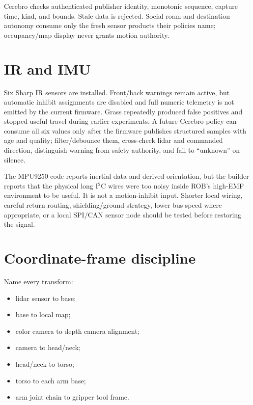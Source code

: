 \documentclass[10pt,openany]{book}
\begin{document}
Cerebro checks authenticated publisher identity, monotonic sequence, capture time, kind, and bounds. Stale data is rejected. Social roam and destination autonomy consume only the fresh sensor products their policies name; occupancy/map display never grants motion authority.

\section{IR and IMU}

\Experimental\quad Six Sharp IR sensors are installed. Front/back warnings remain active, but automatic inhibit assignments are disabled and full numeric telemetry is not emitted by the current firmware. Grass repeatedly produced false positives and stopped useful travel during earlier experiments. A future Cerebro policy can consume all six values only after the firmware publishes structured samples with age and quality; filter/debounce them, cross-check lidar and commanded direction, distinguish warning from safety authority, and fail to ``unknown'' on silence.\par

\Experimental\quad The MPU9250 code reports inertial data and derived orientation, but the builder reports that the physical long I$^2$C wires were too noisy inside ROB's high-EMF environment to be useful. It is not a motion-inhibit input. Shorter local wiring, careful return routing, shielding/ground strategy, lower bus speed where appropriate, or a local SPI/CAN sensor node should be tested before restoring the signal.

\section{Coordinate-frame discipline}

Name every transform:

\begin{itemize}
  \item lidar sensor to base;
  \item base to local map;
  \item color camera to depth camera alignment;
  \item camera to head/neck;
  \item head/neck to torso;
  \item torso to each arm base;
  \item arm joint chain to gripper tool frame.
\end{itemize}
\end{document}
